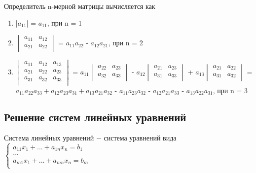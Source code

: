 	Определитель n-мерной матрицы вычисляется как
	\begin{enumerate}
		\item |$a_{11}$| = $a_{11}$, при n = 1
		\item 
		$\begin{vmatrix}
			a_{11} & a_{12}\\
			a_{21} & a_{22}\\
		\end{vmatrix}$ = $a_{11}a_{22}$ - $a_{12}a_{21}$, при n = 2
		\item 
		$\begin{vmatrix}
			a_{11} & a_{12} & a_{13}\\
			a_{21} & a_{22} & a_{23}\\
			a_{31} & a_{32} & a_{33}\\
		\end{vmatrix}$ = $a_{11}
		\begin{vmatrix}
			a_{22} & a_{23}\\
			a_{32} & a_{33}\\
		\end{vmatrix}$ - $a_{12}
		\begin{vmatrix}
			a_{21} & a_{23}\\
			a_{31} & a_{33}\\
		\end{vmatrix}$ + $a_{13}
		\begin{vmatrix}
			a_{21} & a_{22}\\
			a_{31} & a_{32}\\
		\end{vmatrix}$ = $a_{11}a_{22}a_{33} + a_{12}a_{23}a_{31} + a_{13}a_{21}a_{32}$ - $a_{11}a_{23}a_{32}$ - $a_{12}a_{21}a_{33}$ - $a_{13}a_{22}a_{31}$, при n = 3
	\end{enumerate}
	
	\subsection{Решение систем линейных уравнений}
	
	\begin{definition}
		$\textit{Система линейных уравнений}$ $-$ система уравнений вида\\
		$\begin{cases}
			a_{11}x_1 + ... + a_{1n}x_n = b_1\\
			...\\
			a_{m1}x_1 + ... + a_{mn}x_n = b_m\\
		\end{cases}$
	\end{definition}
	

